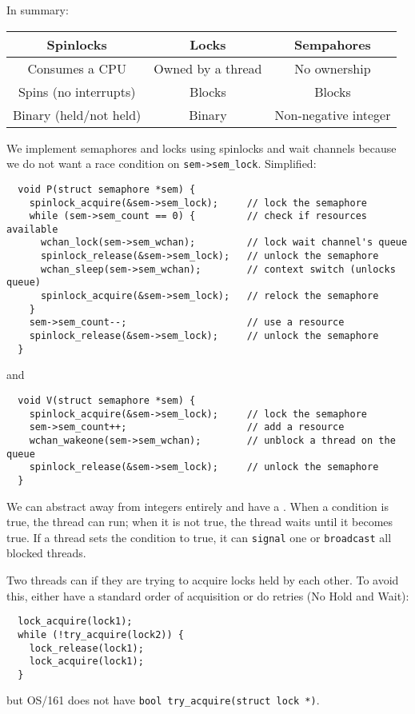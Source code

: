 In summary:
\begin{center}
  \begin{tabular}{c|c|c}
    Spinlocks              & Locks             & Sempahores           \\ \hline
    Consumes a CPU         & Owned by a thread & No ownership         \\
    Spins (no interrupts)  & Blocks            & Blocks               \\
    Binary (held/not held) & Binary            & Non-negative integer
  \end{tabular}
\end{center}
We implement semaphores and locks using spinlocks and wait channels
because we do not want a race condition on \texttt{sem->sem_lock}.
Simplified:
\begin{verbatim}
  void P(struct semaphore *sem) {
    spinlock_acquire(&sem->sem_lock);     // lock the semaphore
    while (sem->sem_count == 0) {         // check if resources available
      wchan_lock(sem->sem_wchan);         // lock wait channel's queue
      spinlock_release(&sem->sem_lock);   // unlock the semaphore
      wchan_sleep(sem->sem_wchan);        // context switch (unlocks queue)
      spinlock_acquire(&sem->sem_lock);   // relock the semaphore
    }
    sem->sem_count--;                     // use a resource
    spinlock_release(&sem->sem_lock);     // unlock the semaphore
  }
\end{verbatim}
and
\begin{verbatim}
  void V(struct semaphore *sem) {
    spinlock_acquire(&sem->sem_lock);     // lock the semaphore
    sem->sem_count++;                     // add a resource
    wchan_wakeone(sem->sem_wchan);        // unblock a thread on the queue
    spinlock_release(&sem->sem_lock);     // unlock the semaphore
  }
\end{verbatim}
We can abstract away from integers entirely and have a .
When a condition is true, the thread can run;
when it is not true, the thread waits until it becomes true.
If a thread sets the condition to true, it can \texttt{signal} one
or \texttt{broadcast} all blocked threads.

Two threads can  if they are trying to acquire locks held by each other.
To avoid this, either have a standard order of acquisition or do retries (No Hold and Wait):
\begin{verbatim}
  lock_acquire(lock1);
  while (!try_acquire(lock2)) {
    lock_release(lock1);
    lock_acquire(lock1);
  }
\end{verbatim}
but OS/161 does not have \texttt{bool try_acquire(struct lock *)}.